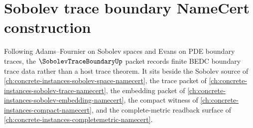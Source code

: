 \chapter{Sobolev trace boundary NameCert construction}
\label{ch:concrete-instances-sobolev-trace-boundary-namecert}

Following Adams--Fournier on Sobolev spaces and Evans on PDE boundary traces, the $\SobolevTraceBoundaryUp$ packet records finite BEDC boundary trace data rather than a host trace theorem. It sits beside the Sobolev source of \autoref{ch:concrete-instances-sobolev-space-namecert}, the trace packet of \autoref{ch:concrete-instances-sobolev-trace-namecert}, the embedding packet of \autoref{ch:concrete-instances-sobolev-embedding-namecert}, the compact witness of \autoref{ch:concrete-instances-compact-namecert}, and the complete-metric readback surface of \autoref{ch:concrete-instances-completemetric-namecert}.

